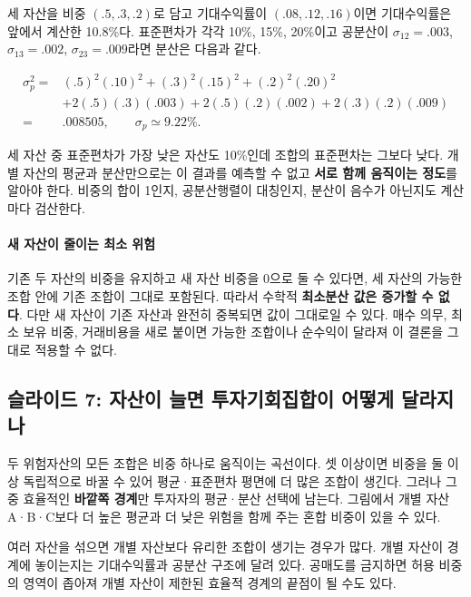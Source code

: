 \documentclass[11pt,a4paper]{article}
\begin{document}
세 자산을 비중 $(.5,.3,.2)$로 담고 기대수익률이 $(.08,.12,.16)$이면 기대수익률은 앞에서 계산한 10.8\%다. 표준편차가 각각 10\%, 15\%, 20\%이고 공분산이 $\sigma_{12}=.003$, $\sigma_{13}=.002$, $\sigma_{23}=.009$라면 분산은 다음과 같다.
\par

\[
\begin{aligned}
\sigma_p^2={}&(.5)^2(.10)^2+(.3)^2(.15)^2+(.2)^2(.20)^2\\
&+2(.5)(.3)(.003)+2(.5)(.2)(.002)+2(.3)(.2)(.009)\\
={}&.008505,\qquad \sigma_p\simeq9.22\%.
\end{aligned}
\]

세 자산 중 표준편차가 가장 낮은 자산도 10\%인데 조합의 표준편차는 그보다 낮다. 개별 자산의 평균과 분산만으로는 이 결과를 예측할 수 없고 \textbf{서로 함께 움직이는 정도}를 알아야 한다. 비중의 합이 1인지, 공분산행렬이 대칭인지, 분산이 음수가 아닌지도 계산마다 검산한다.
\par

\paragraph{새 자산이 줄이는 최소 위험}

기존 두 자산의 비중을 유지하고 새 자산 비중을 0으로 둘 수 있다면, 세 자산의 가능한 조합 안에 기존 조합이 그대로 포함된다. 따라서 수학적 \textbf{최소분산 값은 증가할 수 없다}. 다만 새 자산이 기존 자산과 완전히 중복되면 값이 그대로일 수 있다. 매수 의무, 최소 보유 비중, 거래비용을 새로 붙이면 가능한 조합이나 순수익이 달라져 이 결론을 그대로 적용할 수 없다.
\par

\subsection{슬라이드 7: 자산이 늘면 투자기회집합이 어떻게 달라지나}

두 위험자산의 모든 조합은 비중 하나로 움직이는 곡선이다. 셋 이상이면 비중을 둘 이상 독립적으로 바꿀 수 있어 평균·표준편차 평면에 더 많은 조합이 생긴다. 그러나 그중 효율적인 \textbf{바깥쪽 경계}만 투자자의 평균·분산 선택에 남는다. 그림에서 개별 자산 A·B·C보다 더 높은 평균과 더 낮은 위험을 함께 주는 혼합 비중이 있을 수 있다.
\par

여러 자산을 섞으면 개별 자산보다 유리한 조합이 생기는 경우가 많다. 개별 자산이 경계에 놓이는지는 기대수익률과 공분산 구조에 달려 있다. 공매도를 금지하면 허용 비중의 영역이 좁아져 개별 자산이 제한된 효율적 경계의 끝점이 될 수도 있다.
\par
\end{document}

